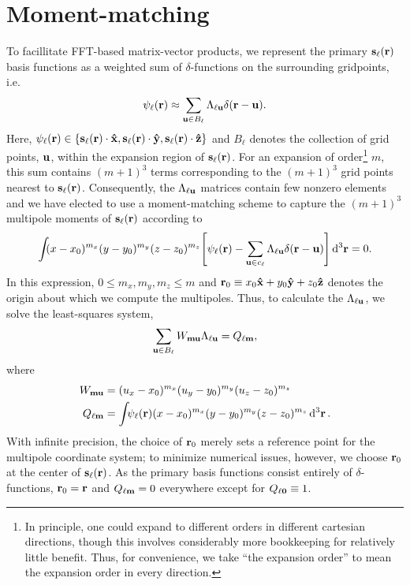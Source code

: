 \section{Moment-matching}

To facillitate FFT-based matrix-vector products, we represent the primary $\vb{s}_\ell(\vb{r})$ basis functions as a weighted sum of $\delta$-functions on the surrounding gridpoints, i.e.
\begin{equation}
  \psi_\ell(\vb{r}) \approx \sum_{\vb{u} \in B_{\ell}} \Lambda_{\ell\vb{u}} \delta(\vb{r} - \vb{u}).
  \label{eq:grid linear combination}
\end{equation}
Here, $\psi_\ell(\vb{r}) \in \qty{\vb{s}_\ell(\vb{r})\cdot \vu{x}, \vb{s}_\ell(\vb{r}) \cdot \vu{y}, \vb{s}_\ell(\vb{r}) \cdot \vu{z}}$ and $B_\ell$ denotes the collection of grid points, $\vb{u}$, within the expansion region of $\vb{s}_\ell(\vb{r})$.
For an expansion of order\footnote{In principle, one could expand to different orders in different cartesian directions, though this involves considerably more bookkeeping for relatively little benefit. Thus, for convenience, we take ``the expansion order'' to mean the expansion order in every direction.} $m$, this sum contains $(m + 1)^3$ terms corresponding to the $(m + 1)^3$ grid points nearest to $\vb{s}_\ell(\vb{r})$.
Consequently, the $\Lambda_{\ell \vb{u}}$ matrices contain few nonzero elements and we have elected to use a moment-matching scheme to capture the $(m + 1)^3$ multipole moments of $\vb{s}_\ell(\vb{r})$ according to
\begin{equation}
  \int_{} \kern0.1em (x - x_0)^{m_x}(y - y_0)^{m_y}(z - z_0)^{m_z} \qty[\psi_\ell(\vb{r}) - \sum_{\vb{u} \in c_\ell}\Lambda_{\ell\vb{u}}\delta(\vb{r} - \vb{u})] \dd[3]{\vb{r}} = 0.
  \label{eq:moment matching}
\end{equation}
In this expression, $0 \leqslant m_x, m_y, m_z \leqslant m$ and $\vb{r}_0 \equiv x_0 \vu{x} + y_0 \vu{y} + z_0\vu{z}$ denotes the origin about which we compute the multipoles.
Thus, to calculate the $\Lambda_{\ell \vb{u}}$, we solve the least-squares system,
\begin{equation}
  \sum_{\vb{u} \in B_\ell} W_{\vb{m}\vb{u}}\Lambda_{\ell\vb{u}} = Q_{\ell\vb{m}},
  \label{eq:expansion matrix system}
\end{equation}
where
\begin{subequations}
  \begin{align}
    W_{\vb{m}\vb{u}} &= (u_x - x_0)^{m_x} (u_y - y_0)^{m_y} (u_z - z_0)^{m_z} \label{eq:w matrix} \\
    Q_{\ell \vb{m}} &= \int_{} \psi_\ell(\vb{r}) (x - x_0)^{m_x} (y - y_0)^{m_y} (z - z_0)^{m_z} \dd[3]{\vb{r}} \label{eq:q vector}.
  \end{align}
\end{subequations}
With infinite precision, the choice of $\vb{r}_0$ merely sets a reference point for the multipole coordinate system; to minimize numerical issues, however, we choose $\vb{r}_0$ at the center of $\vb{s}_\ell(\vb{r})$.
As the primary basis functions consist entirely of $\delta$-functions, $\vb{r}_0 = \vb{r}$ and $Q_{\ell\vb{m}} = 0$ everywhere except for $Q_{\ell \vb{0}} \equiv 1$.



